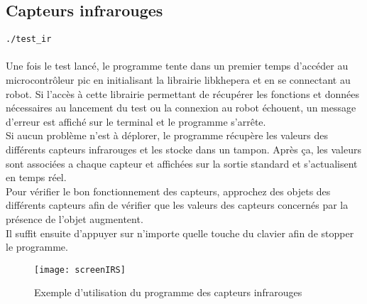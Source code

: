 \documentclass[11pt]{article} %
\begin{document}
\subsection{Capteurs infrarouges}
\verb|./test_ir|\\
 \\
Une fois le test lancé, le programme tente dans un premier temps d’accéder au microcontrôleur pic en initialisant la librairie libkhepera et en se connectant au robot. Si l’accès à cette librairie permettant de récupérer les fonctions et données nécessaires au lancement du test ou la connexion au robot échouent, un message d’erreur est affiché sur le terminal et le programme s’arrête.\\
Si aucun problème n’est à déplorer, le programme récupère les valeurs des différents capteurs infrarouges et les stocke dans un tampon. Après ça, les valeurs sont associées a chaque capteur et affichées sur la sortie standard et s’actualisent en temps réel.\\
Pour vérifier le bon fonctionnement des capteurs, approchez des objets des différents capteurs afin de vérifier que les valeurs des capteurs concernés par la présence de l’objet augmentent.\\
Il suffit ensuite d’appuyer sur n’importe quelle touche du clavier afin de stopper le programme.\\
\begin{figure}[H]
	\caption{Exemple d'utilisation du programme des capteurs infrarouges}
	\texttt{[image: screenIRS]}
\end{figure}
\end{document}
